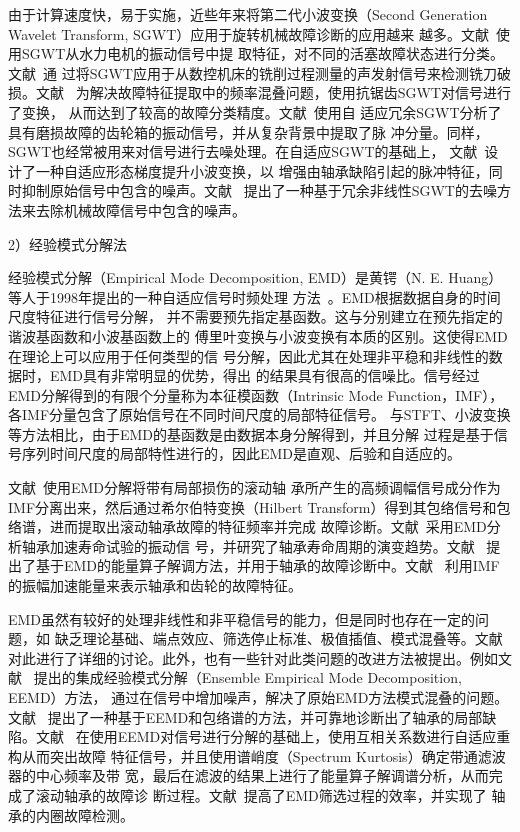 由于计算速度快，易于实施，近些年来将第二代小波变换（Second Generation
Wavelet Transform, SGWT）应用于旋转机械故障诊断的应用越来
越多。文献~使用SGWT从水力电机的振动信号中提
取特征，对不同的活塞故障状态进行分类。文献~通
过将SGWT应用于从数控机床的铣削过程测量的声发射信号来检测铣刀破损。文献~
为解决故障特征提取中的频率混叠问题，使用抗锯齿SGWT对信号进行了变换，
从而达到了较高的故障分类精度。文献~使用自
适应冗余SGWT分析了具有磨损故障的齿轮箱的振动信号，并从复杂背景中提取了脉
冲分量。同样，SGWT也经常被用来对信号进行去噪处理。在自适应SGWT的基础上，
文献~设计了一种自适应形态梯度提升小波变换，以
增强由轴承缺陷引起的脉冲特征，同时抑制原始信号中包含的噪声。文献~
提出了一种基于冗余非线性SGWT的去噪方法来去除机械故障信号中包含的噪声。

2）经验模式分解法

经验模式分解（Empirical Mode Decomposition, EMD）是黄锷（N. E. Huang）等人于1998年提出的一种自适应信号时频处理
方法~\cite{huang1998empirical}。EMD根据数据自身的时间尺度特征进行信号分解，
并不需要预先指定基函数。这与分别建立在预先指定的谐波基函数和小波基函数上的
傅里叶变换与小波变换有本质的区别。这使得EMD在理论上可以应用于任何类型的信
号分解，因此尤其在处理非平稳和非线性的数据时，EMD具有非常明显的优势，得出
的结果具有很高的信噪比。信号经过EMD分解得到的有限个分量称为本征模函数（Intrinsic
Mode Function，IMF），各IMF分量包含了原始信号在不同时间尺度的局部特征信号。
与STFT、小波变换等方法相比，由于EMD的基函数是由数据本身分解得到，并且分解
过程是基于信号序列时间尺度的局部特性进行的，因此EMD是直观、后验和自适应的。

文献~使用EMD分解将带有局部损伤的滚动轴
承所产生的高频调幅信号成分作为IMF分离出来，然后通过希尔伯特变换（Hilbert
Transform）得到其包络信号和包络谱，进而提取出滚动轴承故障的特征频率并完成
故障诊断。文献~采用EMD分析轴承加速寿命试验的振动信
号，并研究了轴承寿命周期的演变趋势。文献~
提出了基于EMD的能量算子解调方法，并用于轴承的故障诊断中。文献~
利用IMF的振幅加速能量来表示轴承和齿轮的故障特征。

EMD虽然有较好的处理非线性和非平稳信号的能力，但是同时也存在一定的问题，如
缺乏理论基础、端点效应、筛选停止标准、极值插值、模式混叠等。文献~
对此进行了详细的讨论。此外，也有一些针对此类问题的改进方法被提出。例如文献~
提出的集成经验模式分解（Ensemble Empirical Mode Decomposition, EEMD）方法，
通过在信号中增加噪声，解决了原始EMD方法模式混叠的问题。文献~
提出了一种基于EEMD和包络谱的方法，并可靠地诊断出了轴承的局部缺陷。文献~
在使用EEMD对信号进行分解的基础上，使用互相关系数进行自适应重构从而突出故障
特征信号，并且使用谱峭度（Spectrum Kurtosis）确定带通滤波器的中心频率及带
宽，最后在滤波的结果上进行了能量算子解调谱分析，从而完成了滚动轴承的故障诊
断过程。文献~提高了EMD筛选过程的效率，并实现了
轴承的内圈故障检测。

